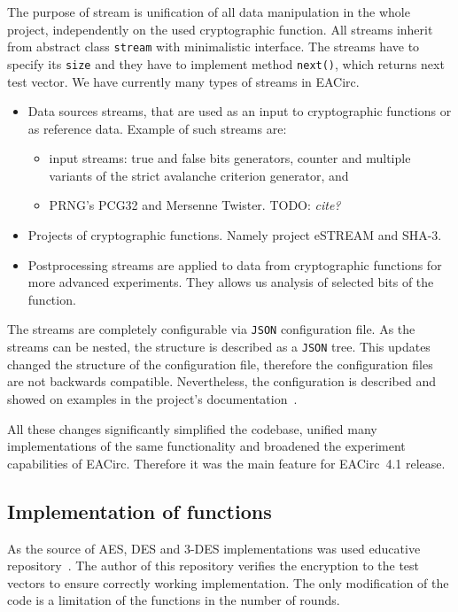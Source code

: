 \documentclass[
  print, %
  Table,   %
  nolof,     %
  nolot,     %
  11pt, %
  oneside  %
]{fithesis3}
\newcommand{\todo}[1]{TODO: \textit{#1}}
\begin{document}
The purpose of stream is unification of all data manipulation in the whole project, independently on the used cryptographic function. All streams inherit from abstract class \texttt{stream} with minimalistic interface. The streams have to specify its \texttt{size} and they have to implement method \texttt{next()}, which returns next test vector. We have currently many types of streams in EACirc.

\begin{itemize}
    \item Data sources streams, that are used as an input to cryptographic functions or as reference data. Example of such streams are:
    \begin{itemize}
        \item input streams: true and false bits generators, counter and multiple variants of the strict avalanche criterion generator, and
        \item PRNG's PCG32 and Mersenne Twister. \todo{cite?}
    \end{itemize}
    \item Projects of cryptographic functions. Namely project eSTREAM and SHA-3.
    \item Postprocessing streams are applied to data from cryptographic functions for more advanced experiments. They allows us analysis of selected bits of the function.
\end{itemize}

The streams are completely configurable via \texttt{JSON} configuration file. As the streams can be nested, the structure is described as a \texttt{JSON} tree. This updates changed the structure of the configuration file, therefore the configuration files are not backwards compatible. Nevertheless, the configuration is described and showed on examples in the project's documentation~\cite{EACirc-wiki-streams}.

All these changes significantly simplified the codebase, unified many implementations of the same functionality and broadened the experiment capabilities of EACirc. Therefore it was the main feature for EACirc~4.1 release.

\subsection{Implementation of functions}
\label{subsec:method-data-funcs}

As the source of AES, DES and 3-DES implementations was used educative repository~\cite{cryptoFunc}. The author of this repository verifies the encryption to the test vectors to ensure correctly working implementation. The only modification of the code is a limitation of the functions in the number of rounds.
\end{document}
